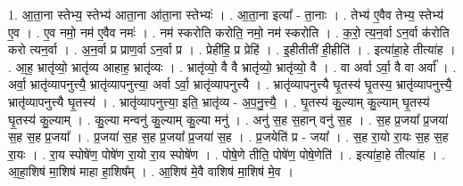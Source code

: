 \documentclass[17pt]{extarticle}
\begin{document}
1. आ॒ता॒ना स्तेभ्य॒ स्तेभ्य॑ आता॒ना आ॑ता॒ना स्तेभ्यः॑ । . आ॒ता॒ना इत्या᳚ - ता॒नाः । . तेभ्य॑ ए॒वैव तेभ्य॒ स्तेभ्य॑ ए॒व । . ए॒व नमो॒ नम॑ ए॒वैव नमः॑ । . नम॑ स्करोति करोति॒ नमो॒ नम॑ स्करोति । . क॒रो॒ त्य॒न॒र्वा ऽन॒र्वा क॑रोति करो त्यन॒र्वा । . अ॒न॒र्वा प्र प्राण॒र्वा ऽन॒र्वा प्र । . प्रेही॑हि॒ प्र प्रेहि॑ । . इ॒हीतीती॑ ही॒हीति॑ । . इत्या॑हा॒हे तीत्या॑ह । . आ॒ह॒ भ्रातृ॑व्यो॒ भ्रातृ॑व्य आहाह॒ भ्रातृ॑व्यः । . भ्रातृ॑व्यो॒ वै वै भ्रातृ॑व्यो॒ भ्रातृ॑व्यो॒ वै । . वा अर्वा ऽर्वा॒ वै वा अर्वा᳚ । . अर्वा॒ भ्रातृ॑व्यापनुत्त्यै॒ भ्रातृ॑व्यापनुत्त्या॒ अर्वा ऽर्वा॒ भ्रातृ॑व्यापनुत्त्यै । . भ्रातृ॑व्यापनुत्त्यै घृ॒तस्य॑ घृ॒तस्य॒ भ्रातृ॑व्यापनुत्त्यै॒ भ्रातृ॑व्यापनुत्त्यै घृ॒तस्य॑ । . भ्रातृ॑व्यापनुत्त्या॒ इति॒ भ्रातृ॑व्य - अ॒प॒नु॒त्त्यै॒ । . घृ॒तस्य॑ कु॒ल्याम् कु॒ल्याम् घृ॒तस्य॑ घृ॒तस्य॑ कु॒ल्याम् । . कु॒ल्या मन्वनु॑ कु॒ल्याम् कु॒ल्या मनु॑ । . अनु॑ स॒ह स॒हान् वनु॑ स॒ह । . स॒ह प्र॒जया᳚ प्र॒जया॑ स॒ह स॒ह प्र॒जया᳚ । . प्र॒जया॑ स॒ह स॒ह प्र॒जया᳚ प्र॒जया॑ स॒ह । . प्र॒जयेति॑ प्र - जया᳚ । . स॒ह रा॒यो रा॒यः स॒ह स॒ह रा॒यः । . रा॒य स्पोषे॑ण॒ पोषे॑ण रा॒यो रा॒य स्पोषे॑ण । . पोषे॒णे तीति॒ पोषे॑ण॒ पोषे॒णेति॑ । . इत्या॑हा॒हे तीत्या॑ह । . आ॒हा॒शिष॑ मा॒शिष॑ माहा हा॒शिष᳚म् । . आ॒शिष॑ मे॒वै वाशिष॑ मा॒शिष॑ मे॒व । \newline
\end{document}
